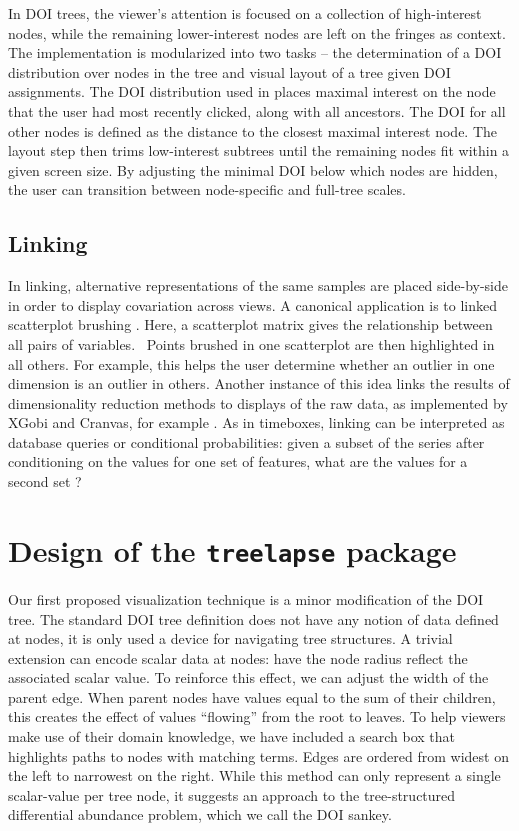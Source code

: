 \documentclass{report}
\begin{document}
In DOI trees, the viewer's attention is focused on a collection of high-interest
nodes, while the remaining lower-interest nodes are left on the fringes as
context. The implementation is modularized into two tasks -- the determination
of a DOI distribution over nodes in the tree and visual layout of a tree given
DOI assignments. The DOI distribution used in \citep{heer2004doitrees} places
maximal interest on the node that the user had most recently clicked, along with
all ancestors. The DOI for all other nodes is defined as the distance to the
closest maximal interest node. The layout step then trims low-interest subtrees
until the remaining nodes fit within a given screen size. By adjusting the
minimal DOI below which nodes are hidden, the user can transition between
node-specific and full-tree scales.

\subsection{Linking}

In linking, alternative representations of the same samples are placed
side-by-side in order to display covariation across views. A canonical
application is to linked scatterplot brushing \citep{becker1987brushing}. Here,
a scatterplot matrix gives the relationship between all pairs of variables.
~Points brushed in one scatterplot are then highlighted in all others. For
example, this helps the user determine whether an outlier in one dimension is an
outlier in others. Another instance of this idea links the results of
dimensionality reduction methods to displays of the raw data, as implemented by
XGobi and Cranvas, for example \citep{xie2013cranvas, swayne1998xgobi}. As in
timeboxes, linking can be interpreted as database queries or conditional
probabilities: given a subset of the series after conditioning on the values for
one set of features, what are the values for a second set
\citep{buja1996interactive}?

\section{Design of the \texttt{treelapse} package}

Our first proposed visualization technique is a minor modification of the DOI
tree. The standard DOI tree definition does not have any notion of data defined
at nodes, it is only used a device for navigating tree structures. A trivial
extension can encode scalar data at nodes: have the node radius reflect the
associated scalar value. To reinforce this effect, we can adjust the width of
the parent edge. When parent nodes have values equal to the sum of their
children, this creates the effect of values ``flowing'' from the root to leaves.
To help viewers make use of their domain knowledge, we have included a search
box that highlights paths to nodes with matching terms. Edges are ordered from
widest on the left to narrowest on the right. While this method can only
represent a single scalar-value per tree node, it suggests an approach to the
tree-structured differential abundance problem, which we call the DOI sankey.
\end{document}
